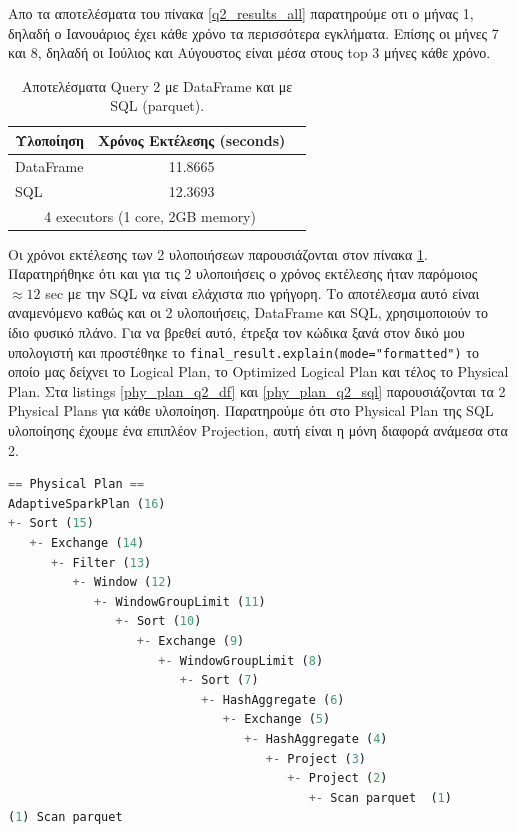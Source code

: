 \documentclass[12pt, a4paper]{article}
\begin{document}
\noindent Απο τα αποτελέσματα του πίνακα \ref{q2_results_all} παρατηρούμε οτι ο μήνας 1, δηλαδή
ο Ιανουάριος έχει κάθε χρόνο τα περισσότερα εγκλήματα. Επίσης οι μήνες 7 και 8, δηλαδή
οι Ιούλιος και Αύγουστος είναι μέσα στους top 3 μήνες κάθε χρόνο.

\begin{table}[h!]
\centering
\begin{tabular}{lcc} 
\hline
Υλοποίηση & Χρόνος Εκτέλεσης (seconds) \\ 
\hline
DataFrame & 11.8665 \\
SQL       & 12.3693 \\

\hline
\multicolumn{2}{c}{4 executors (1 core, 2GB memory)}
\end{tabular}
\caption{Αποτελέσματα Query 2 με DataFrame και με SQL (parquet).}
\label{q2_results_all_parquet}
\end{table}

Οι χρόνοι εκτέλεσης των 2 υλοποιήσεων παρουσιάζονται στον πίνακα \ref{q2_results_all_parquet}.
Παρατηρήθηκε ότι και για τις 2 υλοποιήσεις ο χρόνος εκτέλεσης ήταν παρόμοιος $\approx 12$ sec
με την SQL να είναι ελάχιστα πιο γρήγορη. Το αποτέλεσμα αυτό είναι αναμενόμενο καθώς
και οι 2 υλοποιήσεις, DataFrame και SQL, χρησιμοποιούν το ίδιο φυσικό πλάνο. Για να βρεθεί αυτό,
έτρεξα τον κώδικα ξανά στον δικό μου υπολογιστή και προστέθηκε το \texttt{final\_result.explain(mode="formatted")}
το οποίο μας δείχνει το Logical Plan, το Optimized Logical Plan και τέλος το Physical Plan. Στα listings
\ref{phy_plan_q2_df} και \ref{phy_plan_q2_sql} παρουσιάζονται τα 2 Physical Plans για κάθε υλοποίηση.
Παρατηρούμε ότι στο Physical Plan της SQL υλοποίησης έχουμε ένα επιπλέον Projection, αυτή είναι
η μόνη διαφορά ανάμεσα στα 2.

\begin{lstlisting}[language=python, 
                    breaklines=true, 
                    showstringspaces=false,
                    frame=single, 
                    lineskip=-1pt, 
                    basicstyle=\ttfamily\small, 
                    caption={Physical Plan για το DataFrame, (Q2\_DF.py)}, 
                    captionpos=b, 
                    label={phy_plan_q2_df}]
== Physical Plan ==
AdaptiveSparkPlan (16)
+- Sort (15)
   +- Exchange (14)
      +- Filter (13)
         +- Window (12)
            +- WindowGroupLimit (11)
               +- Sort (10)
                  +- Exchange (9)
                     +- WindowGroupLimit (8)
                        +- Sort (7)
                           +- HashAggregate (6)
                              +- Exchange (5)
                                 +- HashAggregate (4)
                                    +- Project (3)
                                       +- Project (2)
                                          +- Scan parquet  (1)
(1) Scan parquet 
\end{lstlisting}
\end{document}
